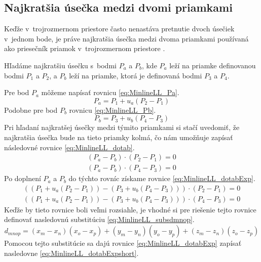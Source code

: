 \subsection*{Najkratšia úsečka medzi dvomi priamkami}
Keďže v~trojrozmernom priestore často nenastáva pretnutie dvoch úsečiek v~jednom bode, je práve najkratšia úsečka medzi dvoma priamkami používaná ako priesečník priamok v~trojrozmernom priestore \cite{bourke_Point_Line_Plane}.


Hľadáme najkratšiu úsečku s~bodmi $P_a$ a $P_b$, kde $P_a$ leží na priamke definovanou bodmi $P_1$ a $P_2$, a $P_b$ leží na priamke, ktorá je definovaná bodmi $P_3$ a $P_4$.

Pre bod $P_a$ môžeme napísať rovnicu  \ref{eq:MinlineLL_Pa}.
\begin{equation}
P_a=P_1 + u_a(P_2-P_1)
    \label{eq:MinlineLL_Pa}
\end{equation}
Podobne pre bod $P_b$ rovnicu \ref{eq:MinlineLL_Pb}.
\begin{equation}
P_b=P_3 + u_b(P_4-P_3)
    \label{eq:MinlineLL_Pb}
\end{equation}
Pri hľadaní najkratšej úsečky medzi týmito priamkami si stačí uvedomiť, že najkratšia úsečka bude na tieto priamky kolmá, čo nám umožňuje zapísať následovné rovnice  \ref{eq:MinlineLL_dotab}.
\begin{equation}
\begin{aligned}
(P_a-P_b) \cdot (P_2-P_1) =0\\
(P_a-P_b) \cdot (P_4-P_3) =0
\end{aligned}
    \label{eq:MinlineLL_dotab}
\end{equation}
Po doplnení  $P_a$ a $P_b$ do týchto rovníc získame rovnice \ref{eq:MinlineLL_dotabExp}.
\begin{equation}
\begin{aligned}
((P_1 + u_a(P_2-P_1))-(P_3 + u_b(P_4-P_3))) \cdot (P_2-P_1) =0\\
((P_1 + u_a(P_2-P_1))-(P_3 + u_b(P_4-P_3))) \cdot (P_4-P_3) =0
\end{aligned}
    \label{eq:MinlineLL_dotabExp}
\end{equation}
Keďže by tieto rovnice boli veľmi rozsiahle, je vhodné si pre riešenie tejto rovnice definovať nasledovnú substitúciu \ref{eq:MinlineLL_subsdmnop}.
\begin{equation}
d_{mnop}=(x_m - x_n)(x_o-x_p)+(y_m - y_n)(y_o-y_p)+(z_m - z_n)(z_o-z_p)
    \label{eq:MinlineLL_subsdmnop}
\end{equation}
Pomocou tejto substitúcie sa dajú rovnice \ref{eq:MinlineLL_dotabExp} zapísať nasledovne \ref{eq:MinlineLL_dotabExpshort}.
